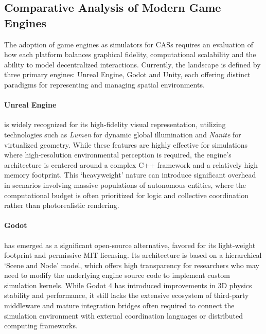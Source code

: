 \subsection{Comparative Analysis of Modern Game Engines}

The adoption of game engines as simulators for \acp{CAS} requires an evaluation of how each platform balances graphical fidelity, computational scalability and the ability to model decentralized interactions. Currently, the landscape is defined by three primary engines: Unreal Engine, Godot and Unity, each offering distinct paradigms for representing and managing spatial environments.

\paragraph{Unreal Engine} is widely recognized for its high-fidelity visual representation, utilizing technologies such as \emph{Lumen} for dynamic global illumination and \emph{Nanite} for virtualized geometry. While these features are highly effective for simulations where high-resolution environmental perception is required, the engine's architecture is centered around a complex C++ framework and a relatively high memory footprint. This `heavyweight' nature can introduce significant overhead in scenarios involving massive populations of autonomous entities, where the computational budget is often prioritized for logic and collective coordination rather than photorealistic rendering.

\paragraph{Godot} has emerged as a significant open-source alternative, favored for its light-weight footprint and permissive MIT licensing. Its architecture is based on a hierarchical `Scene and Node' model, which offers high transparency for researchers who may need to modify the underlying engine source code to implement custom simulation kernels. While Godot 4 has introduced improvements in 3D physics stability and performance, it still lacks the extensive ecosystem of third-party middleware and mature integration bridges often required to connect the simulation environment with external coordination languages or distributed computing frameworks.

